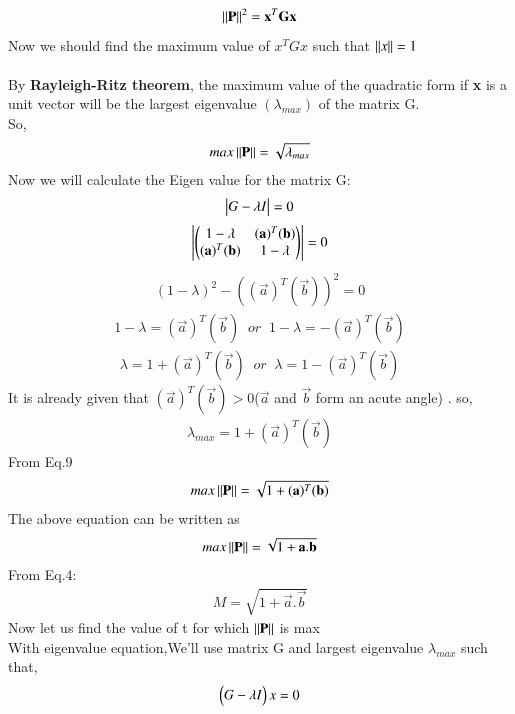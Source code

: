 \documentclass[journal]{IEEEtran}
\theoremstyle{remark}
\begin{document}
\begin{align}
\norm{\Vec{P}}^2=\Vec{x}^T\vec{G}\Vec{x}
  \end{align}
Now we should find the maximum value of \textbf{$x^TGx$} such that $\left\lVert x\right\rVert=1$\\\\
By \textbf{Rayleigh-Ritz theorem}, the maximum value of the quadratic form if \textbf{x} is a unit vector will be the largest eigenvalue $(\lambda_{max})$ of the matrix G.\\
So,
\begin{align}
    max\norm{\Vec{P}}=\sqrt{\lambda_{max}}
\end{align}
Now we will calculate the Eigen value for the matrix G:
\begin{align}
    \begin{vmatrix}G-\lambda I\end{vmatrix}=0
\end{align}
\begin{align}
    \mydet{\myvec{1-\lambda&(\Vec{a})^T(\Vec{b})\\(\Vec{a})^T(\Vec{b})&1-\lambda}}=0
\end{align}
\begin{align}
    (1-\lambda)^2-((\Vec{a})^T(\Vec{b}))^2=0
\end{align}
\begin{align}
    1-\lambda=(\Vec{a})^T(\Vec{b})\;\;or\;\;1-\lambda=-(\Vec{a})^T(\Vec{b})
\end{align}
\begin{align}
    \lambda=1+(\Vec{a})^T(\Vec{b})\;\;or \;\;\lambda=1-(\Vec{a})^T(\Vec{b})
\end{align}
It is already given that $(\Vec{a})^T(\Vec{b})>0 $($\Vec{a}$ and $\Vec{b}$ form an acute angle) . so,
\begin{align}
 \lambda_{max}=1+  (\Vec{a})^T(\Vec{b}) 
\end{align}
From Eq.9
\begin{align}
    max\norm{\Vec{P}}=\sqrt{1+  (\Vec{a})^T(\Vec{b}) }
\end{align}
The above equation can be written as
\begin{align}
   max \norm{\Vec{P}}=\sqrt{1+\Vec{a}.\Vec{b}}
\end{align}
From Eq.4:
\begin{align}
    M=\sqrt{1+\Vec{a}.\Vec{b}}
\end{align}
Now let us find the value of t for which $\norm{\Vec{P}}$ is max\\
With eigenvalue equation,We'll use matrix G and largest eigenvalue $\lambda_{max}$ such that,
\begin{align}
    \begin{pmatrix}G-\lambda I\end{pmatrix}x=0
\end{align}
\end{document}
